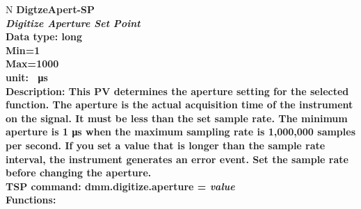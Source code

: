 \documentclass[openany]{article}
\begin{document}
		\begin{tabular}{N}
			\hline
			\bfseries DigtzeApert-SP\label{pv:digtzeapert-sp} \\ \hline
			\emph{Digitize Aperture Set Point} \\
			Data type: long \\
			Min=1 \\
			Max=1000 \\
			unit: \SI{}{\micro\second} \\
			Description: This PV determines the aperture setting for the selected function. The aperture is the actual acquisition time of the instrument on the signal. It must be less than the set sample rate. The minimum aperture is 1 μs when the maximum sampling rate is 1,000,000 samples per second. If you set a value that is longer than the sample rate interval, the instrument generates an error event. Set the sample rate before changing the aperture. \\
			TSP command: dmm.digitize.aperture = \emph{value} \\
			Functions: \\
			\arrayrulecolor{\FuncTableBorderColor}

		\end{tabular}
\end{document}
